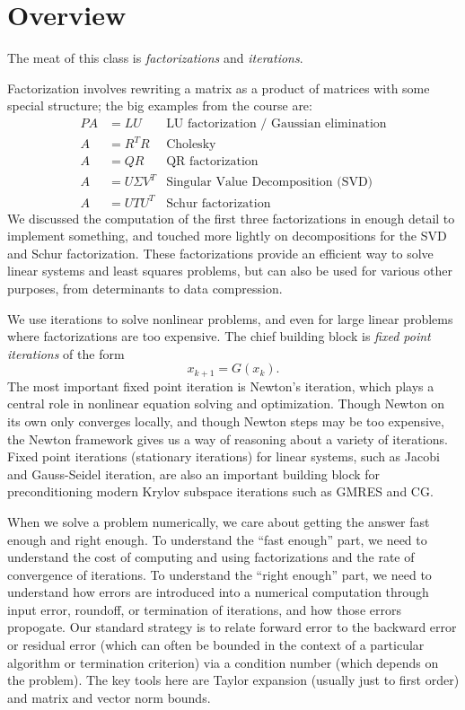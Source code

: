 \documentclass[12pt, leqno]{article}
\begin{document}
\section{Overview}

The meat of this class is {\em factorizations} and {\em iterations}.

Factorization involves rewriting a matrix as a product of matrices
with some special structure; the big examples from the course are:
\begin{align*}
  PA &= LU          & \mbox{LU factorization / Gaussian elimination} \\
  A &= R^T R        & \mbox{Cholesky} \\
  A &= QR           & \mbox{QR factorization} \\
  A &= U \Sigma V^T & \mbox{Singular Value Decomposition (SVD)} \\
  A &= U T U^T      & \mbox{Schur factorization}
\end{align*}
We discussed the computation of the first three factorizations
in enough detail to implement something, and touched more lightly
on decompositions for the SVD and Schur factorization.  These
factorizations provide an efficient way to solve linear systems
and least squares problems, but can also be used for various
other purposes, from determinants to data compression.

We use iterations to solve nonlinear problems, and even for large
linear problems where factorizations are too expensive.  The chief
building block is {\em fixed point iterations} of the form
\[
  x_{k+1} = G(x_k).
\]
The most important fixed point iteration is Newton's iteration,
which plays a central role in nonlinear equation solving and
optimization.  Though Newton on its own only converges locally, and
though Newton steps may be too expensive, the Newton framework gives
us a way of reasoning about a variety of iterations.  Fixed point
iterations (stationary iterations) for linear systems, such as Jacobi
and Gauss-Seidel iteration, are also an important building block for
preconditioning modern Krylov subspace iterations such as GMRES and CG.

When we solve a problem numerically, we care about getting the answer
fast enough and right enough.  To understand the ``fast enough'' part,
we need to understand the cost of computing and using factorizations
and the rate of convergence of iterations.  To understand the ``right
enough'' part, we need to understand how errors are introduced into a
numerical computation through input error, roundoff, or termination of
iterations, and how those errors propogate.  Our standard strategy is
to relate forward error to the backward error or residual error (which
can often be bounded in the context of a particular algorithm or
termination criterion) via a condition number (which depends on the
problem).  The key tools here are Taylor expansion (usually just to
first order) and matrix and vector norm bounds.
\end{document}
